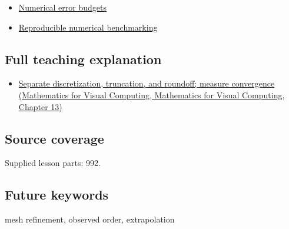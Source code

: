 \begin{itemize}
\tightlist
\item
  \hyperref[appendix-31b8c295e05f]{Numerical error budgets}
\item
  \hyperref[appendix-b9db93e28371]{Reproducible numerical benchmarking}
\end{itemize}

\subsection{Full teaching explanation}\label{appendix-aca80b6bf17a-full-teaching-explanation}

\begin{itemize}
\tightlist
\item
  \href{../02-Mathematics-for-Visual-Computing/main.pdf\#nameddest=02-foundations-ii-ch029-separate-discretization-truncation-and-roundoff-measure-convergence}{Separate discretization, truncation, and roundoff; measure convergence (Mathematics for Visual Computing, Mathematics for Visual Computing, Chapter 13)}
\end{itemize}

\subsection{Source coverage}\label{appendix-aca80b6bf17a-source-coverage}

Supplied lesson parts: 992.

\subsection{Future keywords}\label{appendix-aca80b6bf17a-future-keywords}

mesh refinement, observed order, extrapolation
